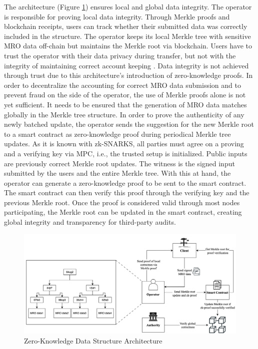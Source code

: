 The architecture (Figure \ref{fig:arch}) ensures local and global data integrity. The operator is responsible for proving local data integrity. Through Merkle proofs and blockchain receipts, users can track whether their submitted data was correctly included in the structure. The operator keeps its local Merkle tree with sensitive MRO data off-chain but maintains the Merkle root via blockchain. Users have to trust the operator with their data privacy during transfer, but not with the integrity of maintaining correct account keeping \citep{sedlemeirgrenenergy}. Data integrity is not achieved through trust due to this architecture's introduction of zero-knowledge proofs. In order to decentralize the accounting for correct MRO data submission and to prevent fraud on the side of the operator, the use of Merkle proofs alone is not yet sufficient. It needs to be ensured that the generation of MRO data matches globally in the Merkle tree structure. In order to prove the authenticity of any newly batched update, the operator sends the suggestion for the new Merkle root to a smart contract as zero-knowledge proof during periodical Merkle tree updates. As it is known with zk-SNARKS, all parties must agree on a proving and a verifying key via MPC, i.e., the trusted setup is initialized. Public inputs are previously correct Merkle root updates. The witness is the signed input submitted by the users and the entire Merkle tree. With this at hand, the operator can generate a zero-knowledge proof to be sent to the smart contract. The smart contract can then verify this proof through the verifying key and the previous Merkle root. Once the proof is considered valid through most nodes participating, the Merkle root can be updated in the smart contract, creating global integrity and transparency for third-party audits. 

\begin{figure}[hbt]
	\centering
		\includegraphics[width=1.0\textwidth]{Pictures/architecture.png}
	\caption{Zero-Knowledge Data Structure Architecture}
	\label{fig:arch}
\end{figure}


